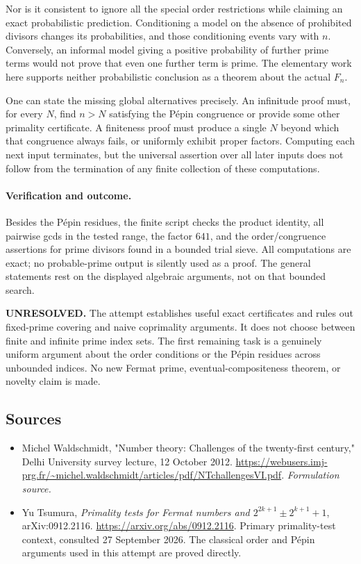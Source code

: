 \documentclass[11pt]{article}
\begin{document}
Nor is it consistent to ignore all the special order restrictions while
claiming an exact probabilistic prediction. Conditioning a model on
the absence of prohibited divisors changes its probabilities, and those
conditioning events vary with $n$. Conversely, an informal model giving
a positive probability of further prime terms would not prove that even
one further term is prime. The elementary work here supports neither
probabilistic conclusion as a theorem about the actual $F_n$.

One can state the missing global alternatives precisely. An infinitude
proof must, for every $N$, find $n>N$ satisfying the P\'epin congruence
or provide some other primality certificate. A finiteness proof must
produce a single $N$ beyond which that congruence always fails, or
uniformly exhibit proper factors. Computing each next input terminates,
but the universal assertion over all later inputs does not follow from
the termination of any finite collection of these computations.

\paragraph{Verification and outcome.}
Besides the P\'epin residues, the finite script checks the product
identity, all pairwise gcds in the tested range, the factor $641$, and
the order/congruence assertions for prime divisors found in a bounded
trial sieve. All computations are exact; no probable-prime output is
silently used as a proof. The general statements rest on the displayed
algebraic arguments, not on that bounded search.

\textbf{UNRESOLVED.} The attempt establishes useful exact certificates
and rules out fixed-prime covering and naive coprimality arguments.
It does not choose between finite and infinite prime index sets. The
first remaining task is a genuinely uniform argument about the order
conditions or the P\'epin residues across unbounded indices. No new
Fermat prime, eventual-compositeness theorem, or novelty claim is made.

\subsection{Sources}
\begin{itemize}
\item[S1]Michel Waldschmidt, "Number theory: Challenges of the twenty-first century," Delhi University survey lecture, 12 October 2012.
\url{https://webusers.imj-prg.fr/~michel.waldschmidt/articles/pdf/NTchallengesVI.pdf}.
\textit{Formulation source.}
\item[E1]Yu Tsumura, \textit{Primality tests for Fermat numbers and
$2^{2k+1}\pm2^{k+1}+1$}, arXiv:0912.2116.
\url{https://arxiv.org/abs/0912.2116}.
Primary primality-test context, consulted 27 September 2026. The classical
order and P\'epin arguments used in this attempt are proved directly.
\end{itemize}
\end{document}
